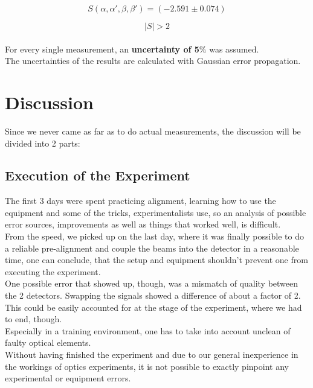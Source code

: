 \documentclass[12pt,a4paper]{article}
\begin{document}
\begin{multicols}{2}
$$S(\alpha, \alpha ', \beta , \beta ') = (-2.591 \pm 0.074)$$

$$|S| > 2$$\\

\noindent For every single measurement, an \textbf{uncertainty of 5$\%$} was assumed.\\
The uncertainties of the results are calculated with Gaussian error propagation.




\section{Discussion}
Since we never came as far as to do actual measurements, the discussion will be divided into 2 parts:

\subsection{Execution of the Experiment}
The first 3 days were spent practicing alignment, learning how to use the equipment and some of the tricks, experimentalists use, so an analysis of possible error sources, improvements as well as things that worked well, is difficult.\\
From the speed, we picked up on the last day, where it was finally possible to do a reliable pre-alignment and couple the beams into the detector in a reasonable time, one can conclude, that the setup and equipment shouldn't prevent one from executing the experiment.\\
One possible error that showed up, though, was a mismatch of quality between the 2 detectors. Swapping the signals showed a difference of about a factor of 2. This could be easily accounted for at the stage of the experiment, where we had to end, though.\\
Especially in a training environment, one has to take into account unclean of faulty optical elements.\\
Without having finished the experiment and due to our general inexperience in the workings of optics experiments, it is not possible to exactly pinpoint any experimental or equipment errors.


\end{multicols}
\end{document}
